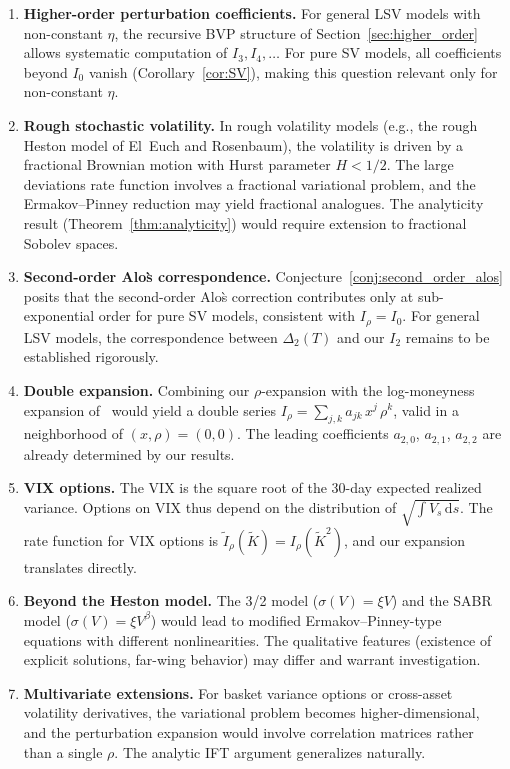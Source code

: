 \documentclass[11pt]{article}
\theoremstyle{definition}
\newcommand{\dd}{\mathrm{d}}
\begin{document}
\begin{enumerate}[label=(\roman*)]
  \item \textbf{Higher-order perturbation coefficients.} For general LSV models with non-constant $\eta$, the recursive BVP structure of Section~\ref{sec:higher_order} allows systematic computation of $I_3, I_4, \ldots$ For pure SV models, all coefficients beyond $I_0$ vanish (Corollary~\ref{cor:SV}), making this question relevant only for non-constant $\eta$.

  \item \textbf{Rough stochastic volatility.} In rough volatility models (e.g., the rough Heston model of El~Euch and Rosenbaum), the volatility is driven by a fractional Brownian motion with Hurst parameter $H < 1/2$. The large deviations rate function involves a fractional variational problem, and the Ermakov--Pinney reduction may yield fractional analogues. The analyticity result (Theorem~\ref{thm:analyticity}) would require extension to fractional Sobolev spaces.

  \item \textbf{Second-order Alo\`s correspondence.} Conjecture~\ref{conj:second_order_alos} posits that the second-order Alo\`s correction contributes only at sub-exponential order for pure SV models, consistent with $I_\rho = I_0$. For general LSV models, the correspondence between $\Delta_2(T)$ and our $I_2$ remains to be established rigorously.

  \item \textbf{Double expansion.} Combining our $\rho$-expansion with the log-moneyness expansion of~\cite{PWZ2025} would yield a double series $I_\rho = \sum_{j,k} a_{jk}\,x^j\,\rho^k$, valid in a neighborhood of $(x,\rho) = (0,0)$. The leading coefficients $a_{2,0}$, $a_{2,1}$, $a_{2,2}$ are already determined by our results.

  \item \textbf{VIX options.} The VIX is the square root of the 30-day expected realized variance. Options on VIX thus depend on the distribution of $\sqrt{\int V_s\,\dd s}$. The rate function for VIX options is $\tilde{I}_\rho(\tilde{K}) = I_\rho(\tilde{K}^2)$, and our expansion translates directly.

  \item \textbf{Beyond the Heston model.} The 3/2 model ($\sigma(V) = \xi V$) and the SABR model ($\sigma(V) = \xi V^\beta$) would lead to modified Ermakov--Pinney-type equations with different nonlinearities. The qualitative features (existence of explicit solutions, far-wing behavior) may differ and warrant investigation.

  \item \textbf{Multivariate extensions.} For basket variance options or cross-asset volatility derivatives, the variational problem becomes higher-dimensional, and the perturbation expansion would involve correlation matrices rather than a single $\rho$. The analytic IFT argument generalizes naturally.
\end{enumerate}
\end{document}
